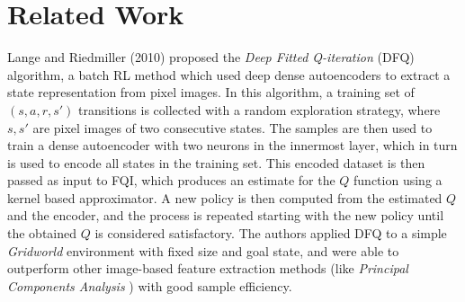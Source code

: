 \section{Related Work}
Lange and Riedmiller (2010) \cite{lange2010deep} proposed the \textit{Deep 
Fitted Q-iteration} (DFQ) algorithm, a batch RL method which used deep dense 
autoencoders to extract a state representation from pixel images. 
In this algorithm, a training set of $(s, a, r, s')$ transitions is collected
with a random exploration strategy, where $s, s'$ are pixel images of two 
consecutive states. The samples are then used to train a dense autoencoder with 
two neurons in the innermost layer, which in turn is used to encode all states 
in the training set. This encoded dataset is then passed as input to FQI, 
which produces an estimate for the $Q$ function using a kernel based 
approximator. A new policy is then computed from the estimated $Q$ and the 
encoder, and the process is repeated starting with the new policy until the 
obtained $Q$ is considered satisfactory.
The authors applied DFQ to a simple \textit{Gridworld} environment with fixed 
size and goal state, and were able to outperform other image-based feature
extraction methods (like \textit{Principal Components Analysis} 
\cite{wold1987principal}) with good sample efficiency.


























